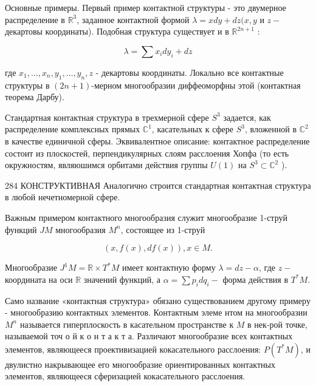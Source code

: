 \documentclass[10pt]{article}
\begin{document}
Основные примеры. Первый пример контактной структуры - это двумерное распределение в $\mathbb{R}^{3}$, заданное контактной формой $\lambda=x d y+d z(x, y$ и $z-$ декартовы координаты). Подобная структура существует и в $\mathbb{R}^{2 n+1}$ :



\[

\lambda=\sum x_{i} d y_{i}+d z

\]



где $x_{1}, \ldots, x_{n}, y_{1}, \ldots, y_{n}, z$ - декартовы координаты. Локально все контактные структуры в $(2 n+1)$-мерном многообразии диффеоморфны этой (контактная теорема Дарбу).



Стандартная контактная структура в трехмерной сфере $S^{3}$ задается, как распределение комплексных прямых $\mathbb{C}^{1}$, касательных к сфере $S^{3}$, вложенной в $\mathbb{C}^{2}$ в качестве единичной сферы. Эквивалентное описание: контактное распределение состоит из плоскостей, перпендикулярных слоям расслоения Хопфа (то есть окружностям, являюшимся орбитами действия группы $U(1)$ на $S^{3} \subset \mathbb{C}^{2}$ ).



284 КОНСТРУКТИВНАЯ Аналогично строится стандартная контактная структура в любой нечетномерной сфере.



Важным примером контактного многообразия служит многообразие 1-струй функций $J M$ многообразия $M^{n}$, состоящее из 1-струй



\[

(x, f(x), d f(x)), x \in M .

\]



Многообразие $J^{1} M=\mathbb{R} \times T^{*} M$ имеет контактную форму $\lambda=d z-\alpha$, где $z-$ координата на оси $\mathbb{R}$ значений функций, а $\alpha=\sum p_{i} d q_{i}-$ форма действия в $T^{*} M$.



Само название «контактная структура» обязано существованием другому примеру - многообразию контактных элементов. Контактным элеме нтом на многообразии $M^{n}$ называется гиперплоскость в касательном пространстве к $M$ в нек-рой точке, называемой точ о й к о н т а к т а. Различают многообразие всех контактных элементов, являющееся проективизацией кокасательного расслоения: $P\left(T^{*} M\right)$, и двулистно накрывающее его многообразие ориентированных контактных элементов, являющееся сферизацией кокасательного расслоения.
\end{document}
